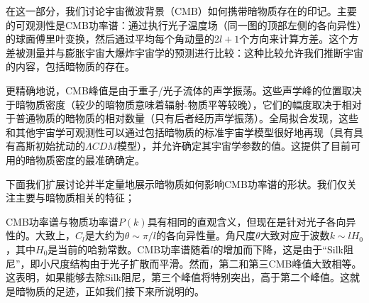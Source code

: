 

在这一部分，我们讨论宇宙微波背景（CMB）如何携带暗物质存在的印记。主要的可观测性是CMB功率谱：通过执行光子温度场（同一图的顶部左侧的各向异性）的球面傅里叶变换，然后通过平均每个角动量的$2l+1$个方向来计算方差。这个方差被测量并与膨胀宇宙大爆炸宇宙学的预测进行比较：这种比较允许我们推断宇宙的内容，包括暗物质的存在。

更精确地说，CMB峰值是由于重子/光子流体的声学振荡。这些声学峰的位置取决于暗物质密度（较少的暗物质意味着辐射-物质平等较晚），它们的幅度取决于相对于普通物质的暗物质的相对数量（只有后者经历声学振荡）。全局拟合发现，这些和其他宇宙学可观测性可以通过包括暗物质的标准宇宙学模型很好地再现（具有具有高斯初始扰动的$\Lambda CDM$模型），并允许确定其宇宙学参数的值。这提供了目前可用的暗物质密度的最准确确定。

下面我们扩展讨论并半定量地展示暗物质如何影响CMB功率谱的形状。我们仅关注主要与暗物质相关的特征； 

CMB功率谱与物质功率谱$P(k)$具有相同的直观含义，但现在是针对光子各向异性的。大致上，$C_l$是大约为$\theta \sim \pi /l$的各向异性量。角尺度$\theta$大致对应于波数$k \sim l H_0$，其中$H_0$是当前的哈勃常数。CMB功率谱随着$l$的增加而下降，这是由于“Silk阻尼”，即小尺度结构由于光子扩散而平滑。然而，第二和第三CMB峰值大致相等。这表明，如果能够去除Silk阻尼，第三个峰值将特别突出，高于第二个峰值。这就是暗物质的足迹，正如我们接下来所说明的。

